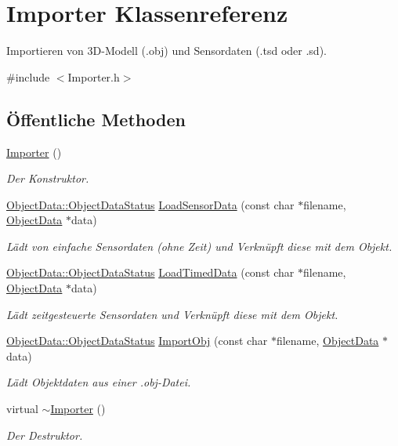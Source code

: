\hypertarget{classImporter}{\section{Importer Klassenreferenz}
\label{classImporter}
}


Importieren von 3\-D-\/\-Modell (.obj) und Sensordaten (.tsd oder .sd).  




{\ttfamily \#include $<$Importer.\-h$>$}

\subsection*{Öffentliche Methoden}
\begin{DoxyCompactItemize}
\item 
\hyperlink{classImporter_afaf93b56e3558a92405ab627ab8ee1d1}{Importer} ()
\begin{DoxyCompactList}\small\item\em Der Konstruktor. \end{DoxyCompactList}\item 
\hyperlink{classObjectData_a20e8cd3cd0f8af3b571b9393aa9e6484}{Object\-Data\-::\-Object\-Data\-Status} \hyperlink{classImporter_a001bd26372d94f96de66f7bcb90cc790}{Load\-Sensor\-Data} (const char $\ast$filename, \hyperlink{classObjectData}{Object\-Data} $\ast$data)
\begin{DoxyCompactList}\small\item\em Lädt von einfache Sensordaten (ohne Zeit) und Verknüpft diese mit dem Objekt. \end{DoxyCompactList}\item 
\hyperlink{classObjectData_a20e8cd3cd0f8af3b571b9393aa9e6484}{Object\-Data\-::\-Object\-Data\-Status} \hyperlink{classImporter_a196e66a161a0102194580ec4b10895e5}{Load\-Timed\-Data} (const char $\ast$filename, \hyperlink{classObjectData}{Object\-Data} $\ast$data)
\begin{DoxyCompactList}\small\item\em Lädt zeitgesteuerte Sensordaten und Verknüpft diese mit dem Objekt. \end{DoxyCompactList}\item 
\hyperlink{classObjectData_a20e8cd3cd0f8af3b571b9393aa9e6484}{Object\-Data\-::\-Object\-Data\-Status} \hyperlink{classImporter_a5013417fb7556dce65dba1ed3aec4e50}{Import\-Obj} (const char $\ast$filename, \hyperlink{classObjectData}{Object\-Data} $\ast$data)
\begin{DoxyCompactList}\small\item\em Lädt Objektdaten aus einer .obj-\/\-Datei. \end{DoxyCompactList}\item 
virtual \hyperlink{classImporter_a6e61faae5020f2dc034ff3ea4032a537}{$\sim$\-Importer} ()
\begin{DoxyCompactList}\small\item\em Der Destruktor. \end{DoxyCompactList}\end{DoxyCompactItemize}


